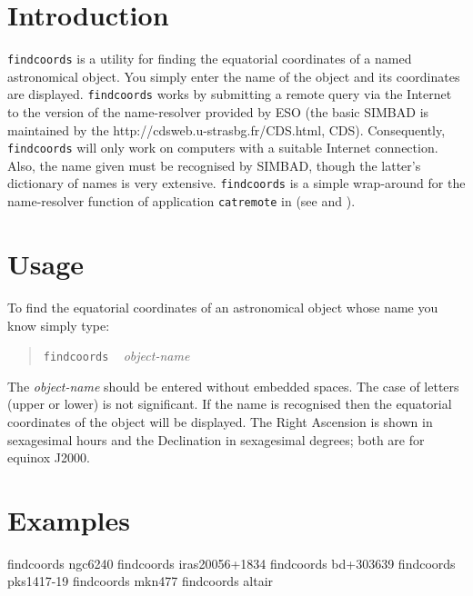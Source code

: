 \documentclass[twoside,11pt,nolof]{starlink}
\begin{document}
\scfrontmatter

\section{Introduction}

\texttt{findcoords} is a utility for finding the equatorial coordinates of
a named astronomical object.  You simply enter the name of the object
and its coordinates are displayed.  \texttt{findcoords} works by submitting a
remote query via the Internet to the version of the
name-resolver provided by ESO (the basic SIMBAD is maintained by the
{http://cdsweb.u-strasbg.fr/CDS.html}, CDS).  Consequently, \texttt{findcoords} will only work on computers with a suitable Internet
connection.  Also, the name given must be recognised by SIMBAD, though
the latter's dictionary of names is very extensive.  \texttt{findcoords} is a
simple wrap-around for the name-resolver function of application \texttt{catremote} in 
(see \cite{SUN190} and
\cite{SSN76}).


\section{Usage}

To find the equatorial coordinates of an astronomical object whose name
you know simply type:

\begin{quote}
\texttt{findcoords} ~ \textit{object-name}
\end{quote}

The \textit{object-name}\/ should be entered without embedded spaces.  The
case of letters (upper or lower) is not significant.  If the name is
recognised then the equatorial coordinates of the object will be displayed.
The Right Ascension is shown in sexagesimal hours and the Declination in
sexagesimal degrees; both are for equinox J2000.


\section{Examples}

\begin{terminalv}
findcoords ngc6240
findcoords iras20056+1834
findcoords bd+303639
findcoords pks1417-19
findcoords mkn477
findcoords altair
\end{terminalv}
\end{document}
